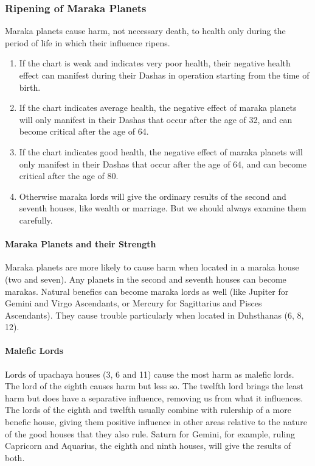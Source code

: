  

\subsubsection{Ripening of Maraka Planets}

Maraka planets cause harm, not necessary death, to health only during the period of life in which their influence ripens.

 
\begin{enumerate}
\item If the chart is weak and indicates very poor health, their negative health effect can manifest during their Dashas in operation starting from the time of birth.
\item If the chart indicates average health, the negative effect of maraka planets will only manifest in their Dashas that occur after the age of 32, and can become critical after the age of 64.
\item If the chart indicates good health, the negative effect of maraka planets will only manifest in their Dashas that occur after the age of 64, and can become critical after the age of 80.
\item Otherwise maraka lords will give the ordinary results of the second and seventh houses, like wealth or marriage. But we should always examine them carefully.
\end{enumerate}


 

\paragraph{Maraka Planets and their Strength}

 

Maraka planets are more likely to cause harm when located in a maraka house (two and seven). Any planets in the second and seventh houses can become marakas.
Natural benefics can become maraka lords as well (like Jupiter for Gemini and Virgo Ascendants, or Mercury for Sagittarius and Pisces Ascendants). They cause trouble particularly when located in Duhsthanas (6, 8, 12).
 

 

\paragraph{Malefic Lords}

 

Lords of upachaya houses (3, 6 and 11) cause the most harm as malefic lords. The lord of the eighth causes harm but less so. The twelfth lord brings the least harm but does have a separative influence, removing us from what it influences. The lords of the eighth and twelfth usually combine with rulership of a more benefic house, giving them positive influence in other areas relative to the nature of the good houses that they also rule. Saturn for Gemini, for example, ruling Capricorn and Aquarius, the eighth and ninth houses, will give the results of both.

